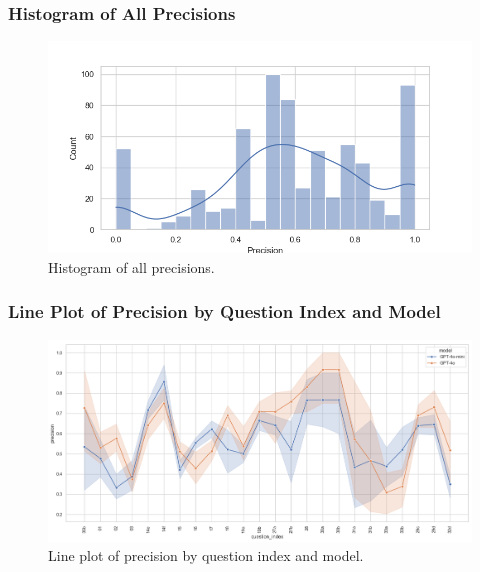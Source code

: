             \subsubsection{Histogram of All Precisions}
            \begin{figure}[H]
                \centering
                \includegraphics[scale=0.75]{images_exp2/precision/hist_precision_all.png}
                \caption{Histogram of all precisions.}
                \label{fig:hist_precision_all}
            \end{figure}

            \subsubsection{Line Plot of Precision by Question Index and Model}
            \begin{figure}[H]
                \centering
                \includegraphics[width=\textwidth]{images_exp2/precision/line_precision_by_question_index_and_model.png}
                \caption{Line plot of precision by question index and model.}
                \label{fig:line_precision_by_question_index_and_model}
            \end{figure}


